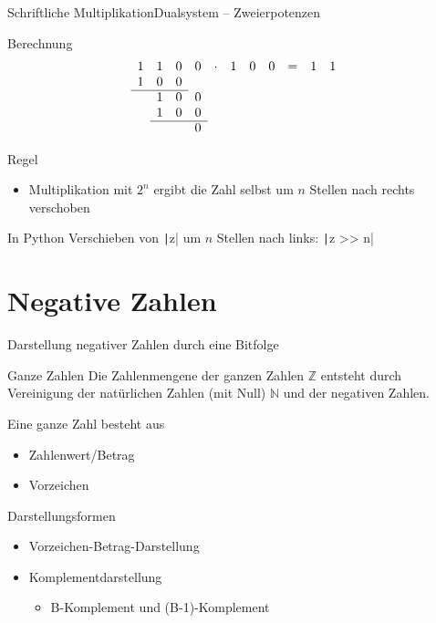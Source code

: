 \documentclass[xelatex,aspectratio=169]{beamer}
\begin{document}
\begin{frame}{Schriftliche Multiplikation}{Dualsystem -- Zweierpotenzen}
  \begin{block}{Berechnung}
    \[
      \begin{array}{ccccccccccccccccccc}
        1 & 1 & 0 & 0 & \cdot & 1 & 0 & 0 & = & 1 & 1 \\
        1 & 0 & 0 &   &       &   &   &               \\
        \cline{1-3}
          & 1 & 0 & 0 &       &   &   &               \\
          & 1 & 0 & 0 &       &   &   &               \\
        \cline{2-4}
          &   &   & 0 &       &   &   &               \\
      \end{array}
    \]
  \end{block}

  \begin{block}{Regel}
    \begin{itemize}
      \item Multiplikation mit $2^n$ ergibt die Zahl selbst um $n$ Stellen nach rechts verschoben
    \end{itemize}
  \end{block}

  \begin{exampleblock}{In Python}
    Verschieben von \texttt|z| um $n$ Stellen nach links: \texttt|z >> n|
  \end{exampleblock}
\end{frame}

\section{Negative Zahlen}

\begin{frame}{Darstellung negativer Zahlen durch eine Bitfolge}
  \begin{block}{Ganze Zahlen}
    Die Zahlenmengene der ganzen Zahlen $\mathbb{Z}$ entsteht durch Vereinigung der natürlichen Zahlen (mit Null) $\mathbb{N}$ und der negativen Zahlen.

    Eine ganze Zahl besteht aus
    \begin{itemize}
      \item Zahlenwert/Betrag
      \item Vorzeichen
    \end{itemize}
  \end{block}

  \begin{block}{Darstellungsformen}
    \begin{itemize}
      \item Vorzeichen-Betrag-Darstellung
      \item Komplementdarstellung
            \begin{itemize}
              \item B-Komplement und (B-1)-Komplement
            \end{itemize}
    \end{itemize}
  \end{block}
\end{frame}
\end{document}

